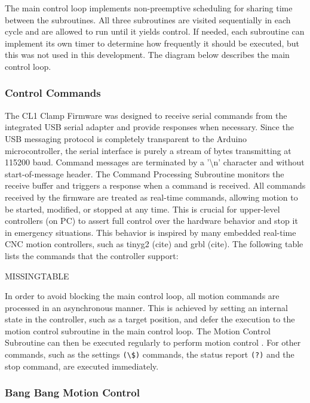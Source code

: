 The main control loop implements non-preemptive scheduling for sharing time between the subroutines. All three subroutines are visited sequentially in each cycle and are allowed to run until it yields control. If needed, each subroutine can implement its own timer to determine how frequently it should be executed, but this was not used in this development. The diagram below describes the main control loop.

\subsubsection{Control Commands}
\label{subsubsection:exploration_1_control_commands}

The CL1 Clamp Firmware was designed to receive serial commands from the integrated USB serial adapter and provide responses when necessary. Since the USB messaging protocol is completely transparent to the Arduino microcontroller, the serial interface is purely a stream of bytes transmitting at 115200 baud. Command messages are terminated by a '\textbackslash n' character and without start-of-message header. The Command Processing Subroutine monitors the receive buffer and triggers a response when a command is received.
All commands received by the firmware are treated as real-time commands, allowing motion to be started, modified, or stopped at any time. This is crucial for upper-level controllers (on PC) to assert full control over the hardware behavior and stop it in emergency situations. This behavior is inspired by many embedded real-time CNC motion controllers, such as tinyg2 (cite) and grbl (cite).
The following table lists the commands that the controller support:

MISSINGTABLE

In order to avoid blocking the main control loop, all motion commands are processed in an asynchronous manner. This is achieved by setting an internal state in the controller, such as a target position, and defer the execution to the motion control subroutine in the main control loop. The Motion Control Subroutine can then be executed regularly to perform motion control .
For other commands, such as the settings \verb|(\$)| commands, the status report \verb|(?)| and the stop command, are executed immediately. 

\subsubsection{Bang Bang Motion Control}
\label{subsubsection:exploration_1_bang_bang_motion_control}


